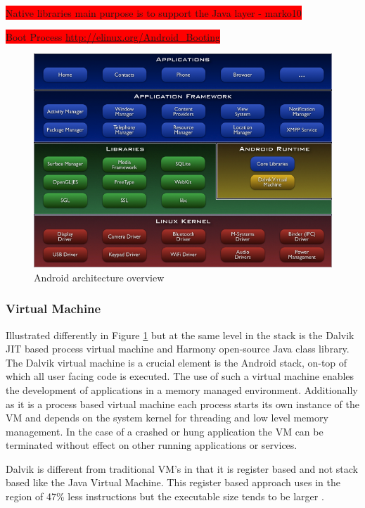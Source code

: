 \colorbox{red}{Native libraries main purpose is to support the Java layer - marko10}

\colorbox{red}{Boot Process \url{http://elinux.org/Android_Booting}}

\begin{figure}[h!]
\centering
    \includegraphics[width=1\textwidth]{research/images/android_arch.png}
    \caption{Android architecture overview}%
    \label{android_arch}
\end{figure}

\subsubsection{Virtual Machine}
Illustrated differently in Figure \ref{android_arch} but at the same level in the stack is the Dalvik JIT based process virtual machine and Harmony open-source Java class library. The Dalvik virtual machine is a crucial element is the Android stack, on-top of which all user facing code is executed.  The use of such a virtual machine enables the development of applications in a memory managed environment. Additionally as it is a process based virtual machine each process starts its own instance of the VM and depends on the system kernel for threading and low level memory management. In the case of a crashed or hung application the VM can be terminated without effect on other running applications or services.

Dalvik is different from traditional VM’s in that it is register based and not stack based like the Java Virtual Machine. This register based approach uses in the region of 47\% less instructions but the executable size tends to be larger \cite{ehringerdalvik10}.


